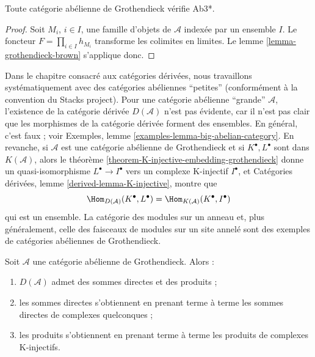 \begin{lemma}
\label{lemma-grothendieck-products}
Toute catégorie abélienne de Grothendieck vérifie Ab3*.
\end{lemma}

\begin{proof}
Soit $M_i$, $i \in I$, une famille d'objets de $\mathcal{A}$ indexée par un
ensemble $I$. Le foncteur $F = \prod_{i \in I} h_{M_i}$ transforme les
colimites en limites. Le
lemme \ref{lemma-grothendieck-brown} s'applique donc.
\end{proof}

\begin{remark}
\label{remark-existence-D}
Dans le chapitre consacré aux catégories dérivées, nous travaillons
systématiquement avec des catégories abéliennes ``petites'' (conformément à
la convention du Stacks project). Pour une catégorie abélienne ``grande''
$\mathcal{A}$, l'existence de la catégorie dérivée $D(\mathcal{A})$ n'est pas
évidente, car il n'est pas clair que les morphismes de la catégorie dérivée
forment des ensembles. En général, c'est faux ; voir
Exemples, lemme \ref{examples-lemma-big-abelian-category}.
En revanche, si $\mathcal{A}$ est une catégorie abélienne de Grothendieck et si
$K^\bullet, L^\bullet$ sont dans $K(\mathcal{A})$, alors le
théorème \ref{theorem-K-injective-embedding-grothendieck} donne un
quasi-isomorphisme $L^\bullet \to I^\bullet$ vers un complexe K-injectif
$I^\bullet$, et Catégories dérivées,
lemme \ref{derived-lemma-K-injective}, montre que
$$
\Hom_{D(\mathcal{A})}(K^\bullet, L^\bullet) =
\Hom_{K(\mathcal{A})}(K^\bullet, I^\bullet)
$$
qui est un ensemble. La catégorie des modules sur un anneau et, plus
généralement, celle des faisceaux de modules sur un site annelé sont des
exemples de catégories abéliennes de Grothendieck.
\end{remark}

\begin{lemma}
\label{lemma-derived-products}
Soit $\mathcal{A}$ une catégorie abélienne de Grothendieck. Alors :
\begin{enumerate}
\item $D(\mathcal{A})$ admet des sommes directes et des produits ;
\item les sommes directes s'obtiennent en prenant terme à terme les sommes
directes de complexes quelconques ;
\item les produits s'obtiennent en prenant terme à terme les produits de
complexes K-injectifs.
\end{enumerate}
\end{lemma}

